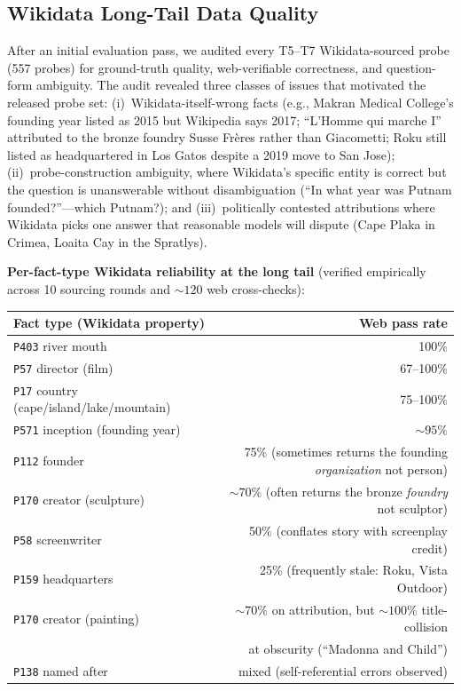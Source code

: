 \documentclass[11pt]{article}
\begin{document}
\subsection{Wikidata Long-Tail Data Quality}
\label{sec:wikidata-audit}

After an initial evaluation pass, we audited every T5--T7 Wikidata-sourced probe (557 probes) for ground-truth quality, web-verifiable correctness, and question-form ambiguity. The audit revealed three classes of issues that motivated the released probe set: (i)~Wikidata-itself-wrong facts (e.g., Makran Medical College's founding year listed as 2015 but Wikipedia says 2017; ``L'Homme qui marche I'' attributed to the bronze foundry Susse Fr\`{e}res rather than Giacometti; Roku still listed as headquartered in Los Gatos despite a 2019 move to San Jose); (ii)~probe-construction ambiguity, where Wikidata's specific entity is correct but the question is unanswerable without disambiguation (``In what year was Putnam founded?''---which Putnam?); and (iii)~politically contested attributions where Wikidata picks one answer that reasonable models will dispute (Cape Plaka in Crimea, Loaita Cay in the Spratlys).

\textbf{Per-fact-type Wikidata reliability at the long tail} (verified empirically across 10 sourcing rounds and ${\sim}120$ web cross-checks):

\begin{center}
\small
\begin{tabular}{lr}
\toprule
\textbf{Fact type (Wikidata property)} & \textbf{Web pass rate} \\
\midrule
\texttt{P403} river mouth                          & 100\% \\
\texttt{P57} director (film)                       & 67--100\% \\
\texttt{P17} country (cape/island/lake/mountain)   & 75--100\% \\
\texttt{P571} inception (founding year)            & ${\sim}95\%$ \\
\texttt{P112} founder                              & 75\% (sometimes returns the founding \emph{organization} not person) \\
\texttt{P170} creator (sculpture)                  & ${\sim}70\%$ (often returns the bronze \emph{foundry} not sculptor) \\
\texttt{P58} screenwriter                          & 50\% (conflates story with screenplay credit) \\
\texttt{P159} headquarters                         & 25\% (frequently stale: Roku, Vista Outdoor) \\
\texttt{P170} creator (painting)                   & ${\sim}70\%$ on attribution, but ${\sim}100\%$ title-collision \\
                                                   & at obscurity (``Madonna and Child'') \\
\texttt{P138} named after                          & mixed (self-referential errors observed) \\
\bottomrule
\end{tabular}
\end{center}
\end{document}
